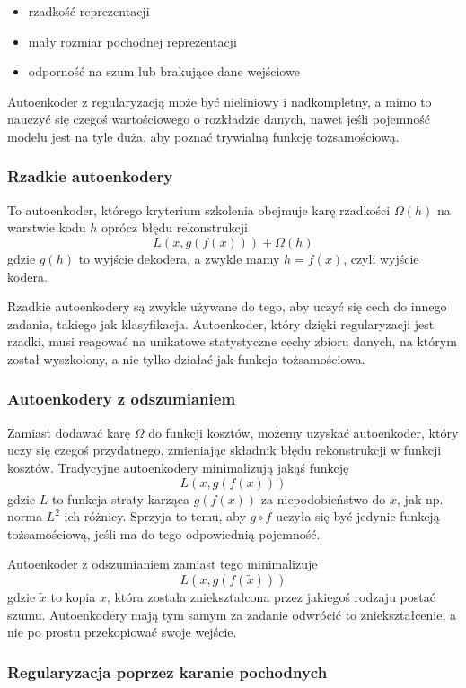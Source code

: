 \documentclass[12pt]{mwbk}
\theoremstyle{plain}
\theoremstyle{definition}
\theoremstyle{remark}
\begin{document}
\begin{itemize}
	\item  rzadkość reprezentacji
	\item mały rozmiar pochodnej reprezentacji
	\item odporność na szum lub brakujące dane wejściowe
\end{itemize}

Autoenkoder z regularyzacją może być nieliniowy i nadkompletny, a mimo to nauczyć się czegoś wartościowego o rozkładzie danych, nawet jeśli pojemność modelu jest na tyle duża, aby poznać trywialną funkcję tożsamościową.

\subsubsection{Rzadkie autoenkodery}

To autoenkoder, którego kryterium szkolenia obejmuje karę rzadkości $\Omega(h)$ na warstwie kodu $h$ oprócz błędu rekonstrukcji
$$L(x, g(f(x)))+\Omega(h)$$
gdzie $g(h)$ to wyjście dekodera, a zwykle mamy $h=f(x)$, czyli wyjście kodera.

Rzadkie autoenkodery są zwykle używane do tego, aby uczyć się cech do innego zadania, takiego jak klasyfikacja. Autoenkoder, który dzięki regularyzacji jest rzadki, musi reagować na unikatowe statystyczne cechy zbioru danych, na którym został wyszkolony, a nie tylko działać jak funkcja tożsamościowa.

\subsubsection{Autoenkodery z odszumianiem}
Zamiast dodawać karę $\Omega$ do funkcji kosztów, możemy uzyskać autoenkoder, który uczy się czegoś przydatnego, zmieniając składnik błędu rekonstrukcji w funkcji kosztów. Tradycyjne autoenkodery minimalizują jakąś funkcję
$$L(x, g(f(x)))$$
gdzie $L$ to funkcja straty karząca $g(f(x))$ za niepodobieństwo do $x$, jak np. norma $L^2$ ich różnicy. Sprzyja to temu, aby $g \circ f$  uczyła się być jedynie funkcją tożsamościową, jeśli ma do tego odpowiednią pojemność.

Autoenkoder z odszumianiem zamiast tego minimalizuje
$$L(x, g(f(\tilde{x})))$$
gdzie $\tilde{x}$ to kopia $x$, która została zniekształcona przez jakiegoś rodzaju postać szumu. Autoenkodery mają tym samym za zadanie odwrócić to zniekształcenie, a nie po prostu przekopiować swoje wejście.

\subsubsection{Regularyzacja poprzez karanie pochodnych}
\end{document}

